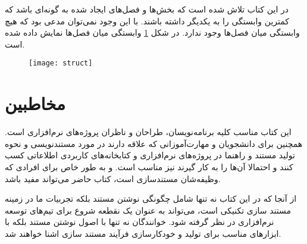 
در این کتاب تلاش شده است که بخش‌ها و فصل‌های ایجاد شده به گونه‌ای باشد که کمترین
وابستگی را به یکدیگر داشته باشند. با این وجود نمی‌توان مدعی بود که هیچ وابستگی
میان فصل‌ها وجود ندارد. در شکل \ref{struct}
وابستگی میان فصل‌ها نمایش داده شده است.

\begin{figure}
\centering
\texttt{[image: struct]}
\label{struct}
\end{figure}


\section{مخاطبین}

این کتاب مناسب کلیه برنامه‌نویسان، طراحان و ناظران پروژه‌های نرم‌افزاری است.
همچنین برای دانشجویان و مهارت‌آموزانی که علاقه دارند در مورد مستندنویسی و نحوه
تولید مستند و راهنما در پروژه‌های نرم‌افزاری و کتابخانه‌های کاربردی اطلاعاتی کسب
کنند و احتمالا آن‌ها را به کار گیرند نیز مناسب است. و به طور خاص برای افرادی که
وظیفه‌شان مستندسازی است، کتاب حاضر می‌تواند مفید باشد.

از آنجا که در این کتاب نه تنها شامل چگونگی نوشتن مستند بلکه تجربیات ما در زمینه
مستند سازی تکنیکی است، می‌تواند به عنوان یک نقطعه شروع برای تیم‌های توسعه
نرم‌افزاری در نظر گرفته شود. خوانندگان نه تنها با اصول نوشتن مستند بلکه با
ابزارهای مناسب برای تولید و خودکارسازی فرآیند مستند سازی اشنا خواهند شد.


